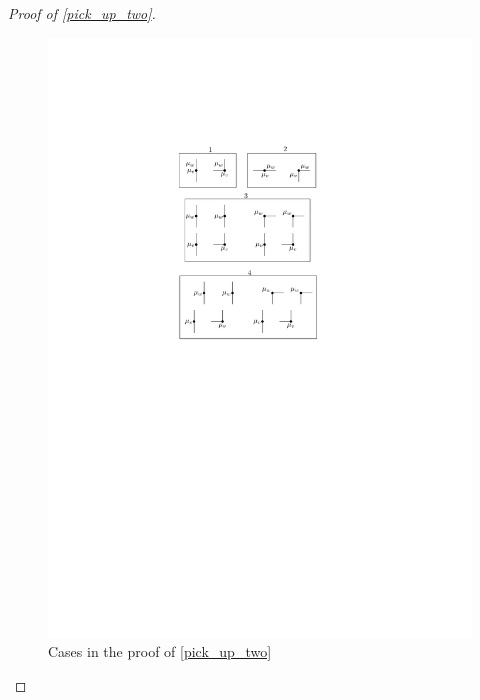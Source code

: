 \documentclass{patmorin}
\begin{document}
\begin{proof}[Proof of \cref{pick_up_two}]
  \begin{figure}
    \begin{center}
      \includegraphics{figs/dumdum}
    \end{center}
    \caption{Cases in the proof of \cref{pick_up_two}}
    \label{cases}
  \end{figure}


\end{proof}
\end{document}
